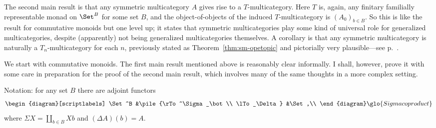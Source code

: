 The second main result is that any symmetric multicategory $A$ gives rise
to a $T$-multicategory.  Here $T$ is, again, any finitary familially
representable monad on $\Set^B$ for some set $B$, and the object-of-objects
of the induced $T$-multicategory is $(A_0)_{b\in B}$.  So this is like the
result for commutative monoids but one level up; it states that symmetric
multicategories play some kind of universal role for generalized
multicategories, despite (apparently) not being generalized multicategories
themselves.  A corollary is that any symmetric multicategory is naturally a
$T_n$-multicategory for each $n$, previously stated as
Theorem~\ref{thm:sm-opetopic} and pictorially very plausible---see
p.~\pageref{eq:Tn-sym-arrow}.

We start with commutative monoids.  The first main result mentioned above
is reasonably clear informally.  I shall, however, prove it with some care
in preparation for the proof of the second main result, which involves many
of the same thoughts in a more complex setting.  

Notation: for any set $B$ there are adjoint functors
%
\[
\begin{diagram}[scriptlabels]
\Set^B	&\pile{\rTo^\Sigma_\bot\\ \lTo_\Delta}	&\Set,\\
\end{diagram}%
% 
\glo{Sigmacoproduct}
% 
\]
where $\Sigma X = \coprod_{b\in B} Xb$ and $(\Delta A)(b) = A$.  

